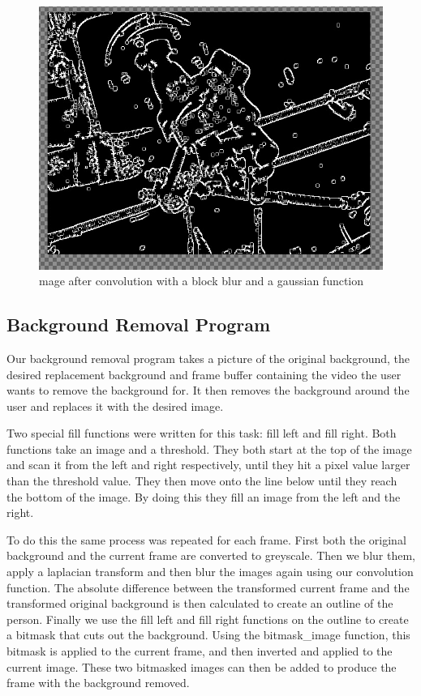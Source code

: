 \documentclass[11pt]{article}
\begin{document}
\begin{figure}[h]
\caption{mage after convolution with a block blur and a gaussian function}
\includegraphics[scale=0.3]{black}
\right
\end{figure}

  \subsection*{Background Removal Program}
Our background removal program takes a picture of the original background, the desired replacement background and frame buffer containing the video the user wants to remove the background for. It then removes the background around the user and replaces it with the desired image. 

Two special fill functions were written for this task: fill left and fill right. Both functions take an image and a threshold. They both start at the top of the image and scan it from the left and right respectively, until they hit a pixel value larger than the threshold value. They then move onto the line below until they reach the bottom of the image. By doing this they fill an image from the left and the right.

To do this the same process was repeated for each frame. First both the original background and the current frame are converted to greyscale. Then we blur them, apply a laplacian transform and then blur the images again using our convolution function. The absolute difference between the transformed current frame and the transformed original background is then calculated to create an outline of the person. Finally we use the fill left and fill right functions on the outline to create a bitmask that cuts out the background. Using the bitmask\_image function, this bitmask is applied to the current frame, and then inverted and applied to the current image. These two bitmasked images can then be added to produce the frame with the background removed. 
\end{document}
